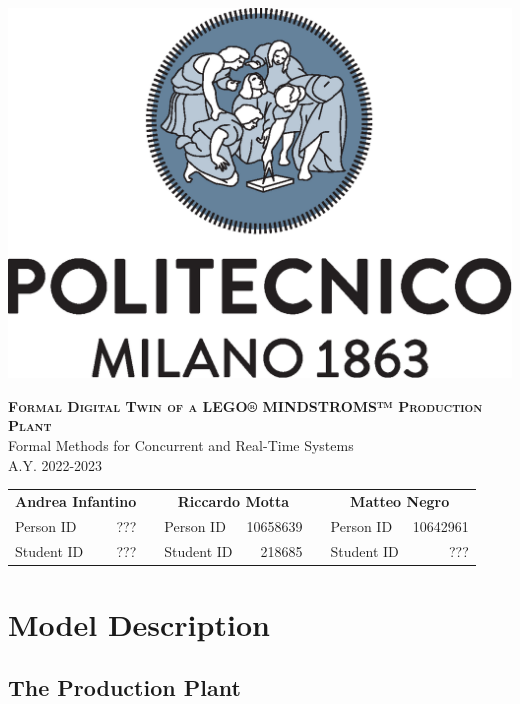 \documentclass[a4paper]{article}
\newcommand\nbvspace[1][3]{\vspace*{\stretch{#1}}}
\begin{document}
    \begin{titlepage}

        \begin{center}

            \nbvspace[1]

            \includegraphics[width=0.3\columnwidth]{./images/polimi}

            \nbvspace[2]

            {\huge \textbf{\textsc{Formal Digital Twin of a LEGO® MINDSTROMS™ Production Plant}}} \\
            [3em]
            {\Large Formal Methods for Concurrent and Real-Time Systems} \\
            [1.5em]
            {\Large A.Y. 2022-2023}

            \nbvspace[8]

            \begin{tabular}{lrp{}lrp{}lr}
                \multicolumn{2}{c}{\Large \textbf{Andrea Infantino}} & & \multicolumn{2}{c}{\Large \textbf{Riccardo Motta}} & & \multicolumn{2}{c}{\Large \textbf{Matteo Negro}} \\
                Person ID & ??? & & Person ID & 10658639 & & Person ID & 10642961 \\
                Student ID & ??? & & Student ID & 218685 & & Student ID & ???
            \end{tabular}

            \nbvspace[1]

        \end{center}

    \end{titlepage}

    \tableofcontents{}

    \pagebreak

    \section{Model Description}

    \subsection{The Production Plant}
\end{document}
